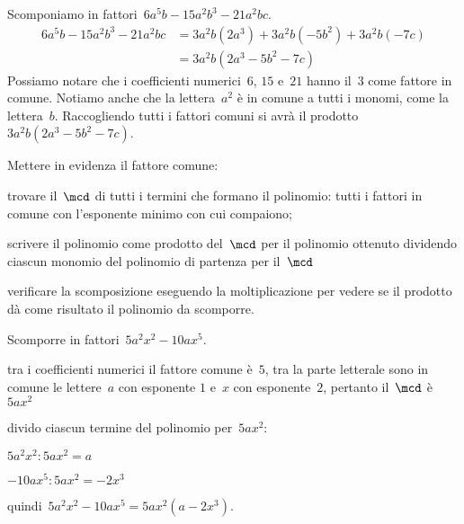  \begin{esempio}
Scomponiamo in fattori~\(6a^{5}b-15a^{2}b^{3}-21a^{2}bc\).
 \begin{equation*}
   \begin{split}
    6a^{5}b-15a^{2}b^{3}-21a^{2}bc 
    &=3a^{2}b(2a^{3})+3a^{2}b(-5b^{2})+3a^{2}b(-7c)\\
    &=3a^{2}b\left(2a^{3}-5b^{2}-7c\right)
   \end{split}
 \end{equation*}
Possiamo notare che i coefficienti numerici~\(6\), \(15\) e~\(21\) hanno il~\(3\) 
come fattore in comune.
Notiamo anche che la lettera~\(a^{2}\) è in comune a tutti i monomi, come la 
lettera~\(b\). 
Raccogliendo tutti i fattori comuni si avrà il prodotto
\(3a^{2}b\left(2a^{3}-5b^{2}-7c\right)\).
 \end{esempio}

\begin{procedura}
Mettere in evidenza il fattore comune:
\begin{enumeratea}
\item trovare il~\(\mcd\) di tutti i termini che formano il polinomio: tutti i 
 fattori in comune con l'esponente minimo con cui compaiono;
\item scrivere il polinomio come prodotto del~\(\mcd\) per il polinomio ottenuto 
 dividendo ciascun monomio del polinomio di partenza per il~\(\mcd\)
\item verificare la scomposizione eseguendo la moltiplicazione per vedere se 
 il prodotto dà come risultato il polinomio da scomporre.
\end{enumeratea}
\end{procedura}

 \begin{esempio}
Scomporre in fattori~\(5a^{2}x^{2}-10ax^{5}\).
  \begin{enumeratea}
  \item tra i coefficienti numerici il fattore comune è~\(5\), 
   tra la parte letterale sono in comune le lettere~\(a\) con esponente \(1\) 
   e~\(x\) con esponente~\(2\), pertanto il~\(\mcd\) è~\(5ax^{2}\)
 \item divido ciascun termine del polinomio per~\(5ax^{2}\):
   \begin{itemize*}
   \item \(5a^{2}x^{2}:5ax^{2}=a\)
   \item \(-10ax^{5}:5ax^{2}=-2x^{3}\)
   \end{itemize*}
  \item quindi~\(5a^{2}x^{2}-10ax^{5}=5ax^{2}(a-2x^{3})\).
  \end{enumeratea}
 \end{esempio}

